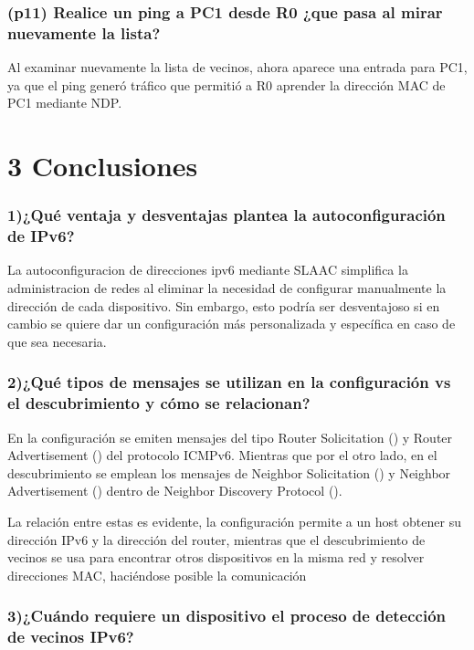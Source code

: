 \documentclass{article}
\begin{document}
\subsubsection*{(p11) Realice un ping a PC1 desde R0 ¿que pasa al mirar nuevamente la lista?}
Al examinar nuevamente la lista de vecinos, ahora aparece una entrada para PC1, ya que el ping generó tráfico que permitió a R0 aprender la dirección MAC de PC1 mediante NDP.


\section*{3 Conclusiones}


\subsubsection*{1)¿Qué ventaja y desventajas plantea la autoconfiguración de IPv6?}
La autoconfiguracion de direcciones ipv6 mediante SLAAC simplifica la administracion de redes al eliminar la necesidad de configurar manualmente la dirección de cada dispositivo. Sin embargo,  esto podría ser desventajoso si en cambio se quiere dar un configuración más personalizada y específica en caso de que sea necesaria.

\subsubsection*{2)¿Qué tipos de mensajes se utilizan en la configuración vs el descubrimiento y cómo se relacionan?}

En la configuración se emiten mensajes del tipo Router Solicitation () y Router Advertisement () del protocolo ICMPv6. Mientras que por el otro lado, en el descubrimiento se emplean los mensajes de Neighbor Solicitation () y Neighbor Advertisement () dentro de Neighbor Discovery Protocol ().

La relación entre estas es evidente, la configuración permite a un host obtener su dirección IPv6 y la dirección del router, mientras que el descubrimiento de vecinos se usa para encontrar otros dispositivos en la misma red y resolver direcciones MAC, haciéndose posible la comunicación

\subsubsection*{3)¿Cuándo requiere un dispositivo el proceso de detección de vecinos IPv6?}
\end{document}

